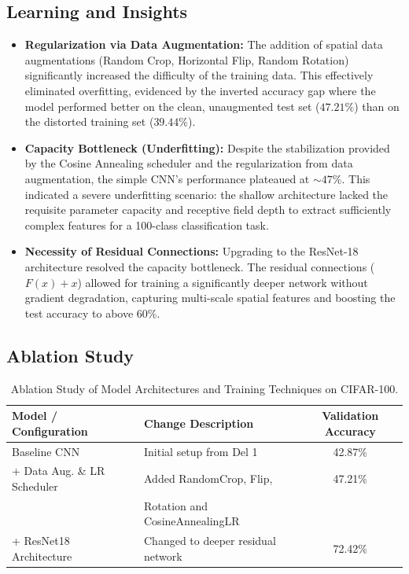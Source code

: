 \documentclass[11pt]{article}
\begin{document}
\subsection{Learning and Insights}
\begin{itemize}
    \item \textbf{Regularization via Data Augmentation:} The addition of spatial data augmentations (Random Crop, Horizontal Flip, Random Rotation) significantly increased the difficulty of the training data. This effectively eliminated overfitting, evidenced by the inverted accuracy gap where the model performed better on the clean, unaugmented test set ($47.21\%$) than on the distorted training set ($39.44\%$).
    \item \textbf{Capacity Bottleneck (Underfitting):} Despite the stabilization provided by the Cosine Annealing scheduler and the regularization from data augmentation, the simple CNN's performance plateaued at $\sim 47\%$. This indicated a severe underfitting scenario: the shallow architecture lacked the requisite parameter capacity and receptive field depth to extract sufficiently complex features for a 100-class classification task.
    \item \textbf{Necessity of Residual Connections:} Upgrading to the ResNet-18 architecture resolved the capacity bottleneck. The residual connections ($F(x) + x$) allowed for training a significantly deeper network without gradient degradation, capturing multi-scale spatial features and boosting the test accuracy to above 60\%.
\end{itemize}

\subsection{Ablation Study}
\begin{table}[H]
    \centering
    \begin{tabular}{llc}
        \toprule
        \textbf{Model / Configuration} & \textbf{Change Description} & \textbf{Validation Accuracy} \\
        \midrule
        Baseline CNN & Initial setup from Del 1 & 42.87\% \\
        + Data Aug. \& LR Scheduler & Added RandomCrop, Flip, & 47.21\% \\
        & Rotation and CosineAnnealingLR & \\
        + ResNet18 Architecture & Changed to deeper residual network & 72.42\% \\
        \bottomrule
    \end{tabular}
    \caption{Ablation Study of Model Architectures and Training Techniques on CIFAR-100.}
    \label{tab:ablation}
\end{table}
\end{document}
